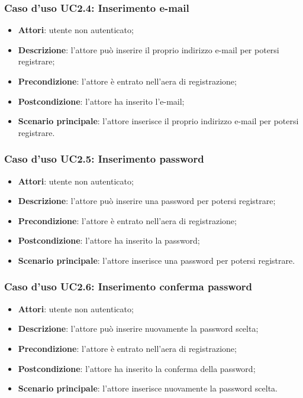 \subsubsection{Caso d'uso UC2.4: Inserimento e-mail}
\begin{itemize}
\item \textbf{Attori}: utente non autenticato;
\item \textbf{Descrizione}: l'attore può inserire il proprio indirizzo e-mail per potersi registrare;
\item \textbf{Precondizione}: l'attore è entrato nell'aera di registrazione;
\item \textbf{Postcondizione}: l'attore ha inserito l'e-mail;
\item \textbf{Scenario principale}: l'attore inserisce il proprio indirizzo e-mail per potersi registrare.
\end{itemize}

\subsubsection{Caso d'uso UC2.5: Inserimento password}
\begin{itemize}
\item \textbf{Attori}: utente non autenticato;
\item \textbf{Descrizione}: l'attore può inserire una password per potersi registrare;
\item \textbf{Precondizione}: l'attore è entrato nell'aera di registrazione;
\item \textbf{Postcondizione}: l'attore ha inserito la password;
\item \textbf{Scenario principale}: l'attore inserisce una password per potersi registrare.
\end{itemize}

\subsubsection{Caso d'uso UC2.6: Inserimento conferma password}
\begin{itemize}
\item \textbf{Attori}: utente non autenticato;
\item \textbf{Descrizione}: l'attore può inserire nuovamente la password scelta;
\item \textbf{Precondizione}: l'attore è entrato nell'aera di registrazione;
\item \textbf{Postcondizione}: l'attore ha inserito la conferma della password;
\item \textbf{Scenario principale}: l'attore inserisce nuovamente la password scelta.
\end{itemize}

